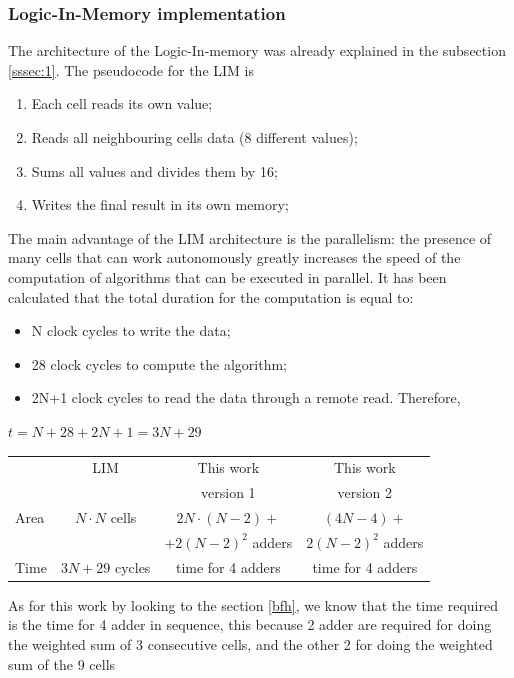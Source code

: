 	  \subsubsection{Logic-In-Memory implementation}
	  The architecture of the Logic-In-memory was already explained in the subsection \ref{sssec:1}.
	  The pseudocode for the LIM is
	  \begin{enumerate}
	  	\item Each cell reads its own value;
	  	\item Reads all neighbouring cells data (8 different values); 
	  	\item Sums all values and divides them by 16;
	  	\item Writes the final result in its own memory;
	  \end{enumerate}
	 The main advantage of the LIM architecture is the parallelism: the presence of many cells that can work autonomously greatly increases the speed of the computation of algorithms that can be executed in parallel. \cite{lim}
	 It has been calculated that the total duration for the computation is equal to: 
	 \begin{itemize}
	 	\item N clock cycles to write the data;
	 	\item 28 clock cycles to compute the algorithm;
	 	\item 2N+1 clock cycles to read the data through a remote read. Therefore,
	 \end{itemize}   \begin{center}
	 	 $ t = N + 28 + 2N +1=3N + 29 $
	\end{center}
	
	 \begin{center}
	 	\begin{tabular}{ | p{1.7cm} | c | c | c |}
	 			
	 		\hline
	 	 & LIM & This work & This work\\
	 	\label{table:bf_tab}	& & version 1& version 2\\
	 			 		\hline
	 		Area & $ N\cdotp N $ cells  &  $ 2N\cdotp (N-2)+$& $(4N-4)+$ \\
	 		& & $+2(N-2)^2$ adders & $2(N-2)^2$ adders \\
	 		\hline
	 		Time & $ 3N + 29 $ cycles
	 		&
	 		 time for 4 adders  &
	 		 time for 4 adders  \\
	 		\hline
	 		
	 	\end{tabular}
	 \end{center}
	As for this work by looking to the section \ref{bfh}, we know that the time required is the time for 4 adder in sequence, this because 2 adder are required for doing the weighted sum of 3 consecutive cells, and the other 2 for doing the weighted sum of the 9 cells

